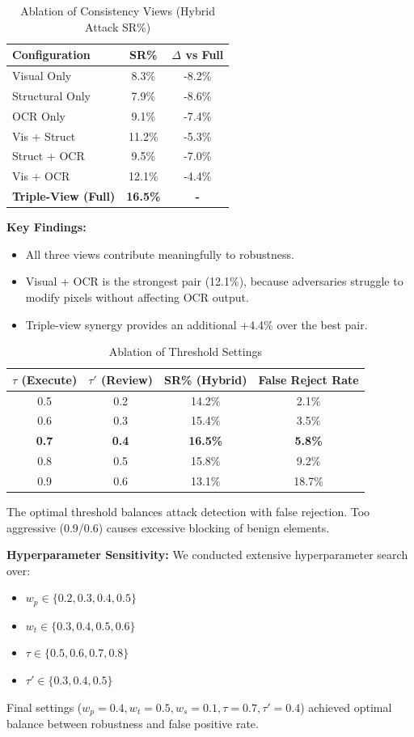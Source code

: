 \documentclass[runningheads]{llncs}
\begin{document}
\begin{table}[ht]
\caption{Ablation of Consistency Views (Hybrid Attack SR\%)}
\centering
\begin{tabular}{|l|c|c|}
\hline
Configuration & SR\% & $\Delta$ vs Full \\
\hline
Visual Only & 8.3\% & -8.2\% \\
Structural Only & 7.9\% & -8.6\% \\
OCR Only & 9.1\% & -7.4\% \\
Vis + Struct & 11.2\% & -5.3\% \\
Struct + OCR & 9.5\% & -7.0\% \\
Vis + OCR & 12.1\% & -4.4\% \\
\textbf{Triple-View (Full)} & \textbf{16.5\%} & \textbf{-} \\
\hline
\end{tabular}
\end{table}

\textbf{Key Findings:}
\begin{itemize}
    \item All three views contribute meaningfully to robustness.
    \item Visual + OCR is the strongest pair (12.1\%), because adversaries struggle to modify pixels without affecting OCR output.
    \item Triple-view synergy provides an additional +4.4\% over the best pair.
\end{itemize}

\begin{table}[ht]
\caption{Ablation of Threshold Settings}
\centering
\begin{tabular}{|c|c|c|c|}
\hline
$\tau$ (Execute) & $\tau'$ (Review) & SR\% (Hybrid) & False Reject Rate \\
\hline
0.5 & 0.2 & 14.2\% & 2.1\% \\
0.6 & 0.3 & 15.4\% & 3.5\% \\
\textbf{0.7} & \textbf{0.4} & \textbf{16.5\%} & \textbf{5.8\%} \\
0.8 & 0.5 & 15.8\% & 9.2\% \\
0.9 & 0.6 & 13.1\% & 18.7\% \\
\hline
\end{tabular}
\end{table}

The optimal threshold balances attack detection with false rejection. Too aggressive (0.9/0.6) causes excessive blocking of benign elements.

\textbf{Hyperparameter Sensitivity:}
We conducted extensive hyperparameter search over:
\begin{itemize}
    \item $w_p \in \{0.2, 0.3, 0.4, 0.5\}$
    \item $w_t \in \{0.3, 0.4, 0.5, 0.6\}$  
    \item $\tau \in \{0.5, 0.6, 0.7, 0.8\}$
    \item $\tau' \in \{0.3, 0.4, 0.5\}$
\end{itemize}
Final settings ($w_p=0.4, w_t=0.5, w_s=0.1, \tau=0.7, \tau'=0.4$) achieved optimal balance between robustness and false positive rate.
\end{document}
